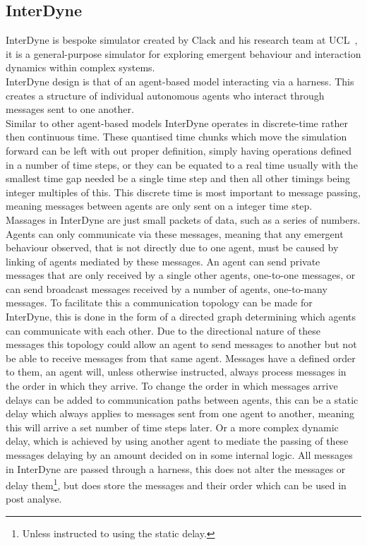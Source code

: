 \documentclass{article}
\begin{document}
\subsection{InterDyne} 
InterDyne is bespoke simulator created by Clack and his research team at UCL~\cite{Chris_webPage}, it is a general-purpose simulator for exploring emergent behaviour and interaction dynamics within complex systems.\\
InterDyne design is that of an agent-based model interacting via a harness. This creates a structure of individual autonomous agents who interact through messages sent to one another.\\ 
Similar to other agent-based models InterDyne operates in discrete-time rather then continuous time. These quantised time chunks which move the simulation forward can be left with out proper definition, simply having operations defined in a number of time steps, or they can be equated to a real time usually with the smallest time gap needed be a single time step and then all other timings being integer multiples of this. This discrete time is most important to message passing, meaning messages between agents are only sent on a integer time step.\\ 
Massages in InterDyne are just small packets of data, such as a series of numbers.  Agents can only communicate via these messages, meaning that any emergent behaviour observed, that is not directly due to one agent, must be caused by linking of agents mediated by these messages. An agent can send private messages that are only received by a single other agents, one-to-one messages, or can send broadcast messages received by a number of agents, one-to-many messages. To facilitate this a communication topology can be made for InterDyne, this is done in the form of a directed graph determining which agents can communicate with each other. Due to the directional nature of these messages this topology could allow an agent to send messages to another but not be able to receive messages from that same agent. Messages have a defined order to them, an agent will, unless otherwise instructed, always process messages in the order in which they arrive. To change the order in which messages arrive delays can be added to communication paths between agents, this can be a static delay which always applies to messages sent from one agent to another, meaning this will arrive a set number of time steps later. Or a more complex dynamic delay, which is achieved by using another agent to mediate the passing of these messages delaying by an amount decided on in some internal logic. All messages in InterDyne are passed through a harness, this does not alter the messages or delay them\footnote{Unless instructed to using the static delay.}, but does store the messages and their order which can be used in post analyse.\\         
\end{document}
